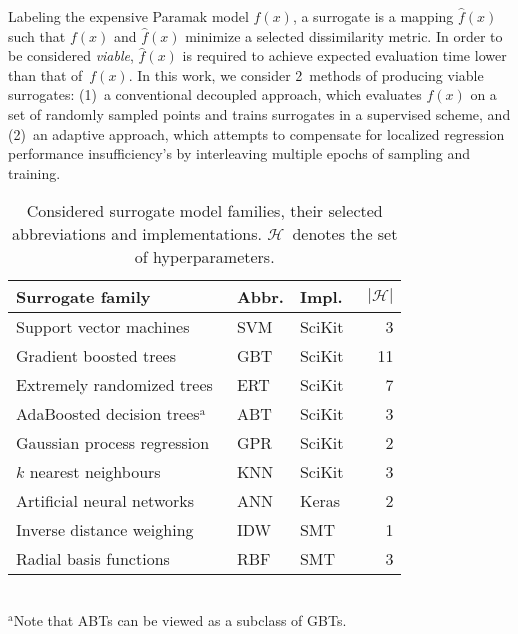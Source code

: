 Labeling the expensive Paramak model $f(x)$, a surrogate is a mapping
$\hat{f}(x)$ such that $f(x)$ and $\hat{f}(x)$ minimize a selected dissimilarity
metric. In order to be considered \textit{viable}, $\hat{f}(x)$ is required to
achieve expected evaluation time lower than that of~$f(x)$. In this work, we
consider 2~methods of producing viable surrogates: (1)~a conventional decoupled
approach, which evaluates $f(x)$ on a set of randomly sampled points and
trains surrogates in a supervised scheme, and (2)~an adaptive approach, which attempts to
compensate for localized regression performance insufficiency's by interleaving
multiple epochs of sampling and training.

\begin{table}[t]
	\setlength\tabcolsep{1pt}
	\renewcommand{\arraystretch}{0.95}
	\caption{\label{tbl:surrogates}Considered surrogate model families, their
		selected abbreviations and implementations. $\mathcal{H}$~denotes the
		set of hyperparameters.}
	\begin{indented}
	\item[]
		\begin{tabular}{lllr}
		\toprule
		Surrogate family & Abbr. & Impl. & $|\mathcal{H}|$ \\
		\midrule
		Support vector machines~\cite{fan2008liblinear}	& SVM & SciKit~\cite{scikit-learn} & 3 \\
		Gradient boosted trees~\cite{friedman2001greedy,friedman1999stochastic,hastie2009elements}	& GBT & SciKit & 11 \\
		Extremely randomized trees~\cite{geurts2006extremely}	& ERT & SciKit & 7 \\
		AdaBoosted decision trees$^\text{a}$~\cite{drucker1997improving}	& ABT & SciKit & 3 \\
		Gaussian process regression~\cite{williams2006gaussian}	& GPR & SciKit & 2 \\
		$k$ nearest neighbours	& KNN & SciKit & 3 \\
		Artificial neural networks	& ANN & Keras~\cite{chollet2015keras} & 2 \\
		Inverse distance weighing~\cite{shepard1968two} & IDW & SMT~\cite{SMT2019} & 1 \\
		Radial basis functions & RBF & SMT & 3 \\
		\bottomrule
		\end{tabular}\\%
		{\footnotesize $^\text{a}$Note that ABTs can be viewed as a subclass of GBTs.}
	\end{indented}
\end{table}

